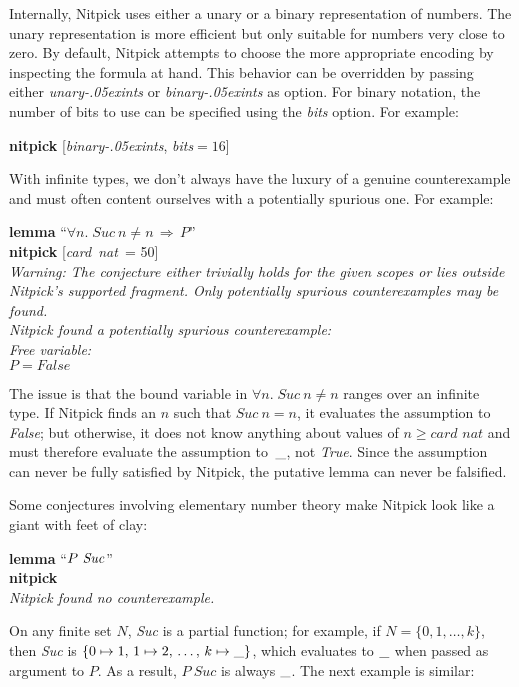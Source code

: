 \documentclass[a4paper,12pt]{article}
\def\unk{{\_}}
\renewcommand\_{\hbox{\textunderscore\kern-.05ex}}
\begin{document}
Internally, Nitpick uses either a unary or a binary representation of numbers.
The unary representation is more efficient but only suitable for numbers very
close to zero. By default, Nitpick attempts to choose the more appropriate
encoding by inspecting the formula at hand. This behavior can be overridden by
passing either \textit{unary\_ints} or \textit{binary\_ints} as option. For
binary notation, the number of bits to use can be specified using
the \textit{bits} option. For example:

\prew
\textbf{nitpick} [\textit{binary\_ints}, \textit{bits}${} = 16$]
\postw

With infinite types, we don't always have the luxury of a genuine counterexample
and must often content ourselves with a potentially spurious one.
For example:

\prew
\textbf{lemma} ``$\forall n.\; \textit{Suc}~n \mathbin{\not=} n \,\Longrightarrow\, P$'' \\
\textbf{nitpick} [\textit{card~nat}~= 50] \\[2\smallskipamount]
\slshape Warning: The conjecture either trivially holds for the given scopes or lies outside Nitpick's supported
fragment. Only potentially spurious counterexamples may be found. \\[2\smallskipamount]
Nitpick found a potentially spurious counterexample: \\[2\smallskipamount]
\hbox{}\qquad Free variable: \nopagebreak \\
\hbox{}\qquad\qquad $P = \textit{False}$
\postw

The issue is that the bound variable in $\forall n.\;
\textit{Suc}~n \mathbin{\not=} n$ ranges over an infinite type. If Nitpick finds
an $n$ such that $\textit{Suc}~n \mathbin{=} n$, it evaluates the assumption to
\textit{False}; but otherwise, it does not know anything about values of $n \ge
\textit{card~nat}$ and must therefore evaluate the assumption to~$\unk$, not
\textit{True}. Since the assumption can never be fully satisfied by Nitpick,
the putative lemma can never be falsified.

Some conjectures involving elementary number theory make Nitpick look like a
giant with feet of clay:

\prew
\textbf{lemma} ``$P~\textit{Suc\/}$'' \\
\textbf{nitpick} \\[2\smallskipamount]
\slshape
Nitpick found no counterexample.
\postw

On any finite set $N$, \textit{Suc} is a partial function; for example, if $N =
\{0, 1, \ldots, k\}$, then \textit{Suc} is $\{0 \mapsto 1,\, 1 \mapsto 2,\,
\ldots,\, k \mapsto \unk\}$, which evaluates to $\unk$ when passed as
argument to $P$. As a result, $P~\textit{Suc}$ is always $\unk$. The next
example is similar:
\end{document}
